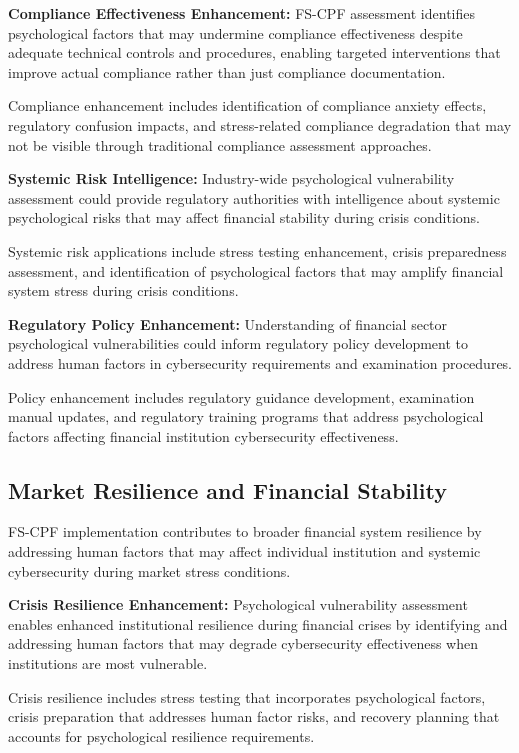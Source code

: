 \documentclass[10pt, twocolumn]{article}
\begin{document}
\textbf{Compliance Effectiveness Enhancement:} FS-CPF assessment identifies psychological factors that may undermine compliance effectiveness despite adequate technical controls and procedures, enabling targeted interventions that improve actual compliance rather than just compliance documentation.

Compliance enhancement includes identification of compliance anxiety effects, regulatory confusion impacts, and stress-related compliance degradation that may not be visible through traditional compliance assessment approaches.

\textbf{Systemic Risk Intelligence:} Industry-wide psychological vulnerability assessment could provide regulatory authorities with intelligence about systemic psychological risks that may affect financial stability during crisis conditions.

Systemic risk applications include stress testing enhancement, crisis preparedness assessment, and identification of psychological factors that may amplify financial system stress during crisis conditions.

\textbf{Regulatory Policy Enhancement:} Understanding of financial sector psychological vulnerabilities could inform regulatory policy development to address human factors in cybersecurity requirements and examination procedures.

Policy enhancement includes regulatory guidance development, examination manual updates, and regulatory training programs that address psychological factors affecting financial institution cybersecurity effectiveness.

\subsection{Market Resilience and Financial Stability}

FS-CPF implementation contributes to broader financial system resilience by addressing human factors that may affect individual institution and systemic cybersecurity during market stress conditions.

\textbf{Crisis Resilience Enhancement:} Psychological vulnerability assessment enables enhanced institutional resilience during financial crises by identifying and addressing human factors that may degrade cybersecurity effectiveness when institutions are most vulnerable.

Crisis resilience includes stress testing that incorporates psychological factors, crisis preparation that addresses human factor risks, and recovery planning that accounts for psychological resilience requirements.
\end{document}
